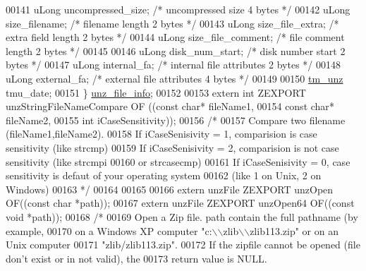 \begin{DoxyCode}
00141     uLong uncompressed\_size;    \textcolor{comment}{/* uncompressed size               4 bytes */}
00142     uLong size\_filename;        \textcolor{comment}{/* filename length                 2 bytes */}
00143     uLong size\_file\_extra;      \textcolor{comment}{/* extra field length              2 bytes */}
00144     uLong size\_file\_comment;    \textcolor{comment}{/* file comment length             2 bytes */}
00145 
00146     uLong disk\_num\_start;       \textcolor{comment}{/* disk number start               2 bytes */}
00147     uLong internal\_fa;          \textcolor{comment}{/* internal file attributes        2 bytes */}
00148     uLong external\_fa;          \textcolor{comment}{/* external file attributes        4 bytes */}
00149 
00150     \hyperlink{structtm__unz__s}{tm\_unz} tmu\_date;
00151 \} \hyperlink{structunz__file__info__s}{unz\_file\_info};
00152 
00153 \textcolor{keyword}{extern} \textcolor{keywordtype}{int} ZEXPORT unzStringFileNameCompare OF ((\textcolor{keyword}{const} \textcolor{keywordtype}{char}* fileName1,
00154                                                  \textcolor{keyword}{const} \textcolor{keywordtype}{char}* fileName2,
00155                                                  \textcolor{keywordtype}{int} iCaseSensitivity));
00156 \textcolor{comment}{/*}
00157 \textcolor{comment}{   Compare two filename (fileName1,fileName2).}
00158 \textcolor{comment}{   If iCaseSenisivity = 1, comparision is case sensitivity (like strcmp)}
00159 \textcolor{comment}{   If iCaseSenisivity = 2, comparision is not case sensitivity (like strcmpi}
00160 \textcolor{comment}{                                or strcasecmp)}
00161 \textcolor{comment}{   If iCaseSenisivity = 0, case sensitivity is defaut of your operating system}
00162 \textcolor{comment}{    (like 1 on Unix, 2 on Windows)}
00163 \textcolor{comment}{*/}
00164 
00165 
00166 \textcolor{keyword}{extern} unzFile ZEXPORT unzOpen OF((\textcolor{keyword}{const} \textcolor{keywordtype}{char} *path));
00167 \textcolor{keyword}{extern} unzFile ZEXPORT unzOpen64 OF((\textcolor{keyword}{const} \textcolor{keywordtype}{void} *path));
00168 \textcolor{comment}{/*}
00169 \textcolor{comment}{  Open a Zip file. path contain the full pathname (by example,}
00170 \textcolor{comment}{     on a Windows XP computer "c:\(\backslash\)\(\backslash\)zlib\(\backslash\)\(\backslash\)zlib113.zip" or on an Unix computer}
00171 \textcolor{comment}{     "zlib/zlib113.zip".}
00172 \textcolor{comment}{     If the zipfile cannot be opened (file don't exist or in not valid), the}
00173 \textcolor{comment}{       return value is NULL.}

\end{DoxyCode}
